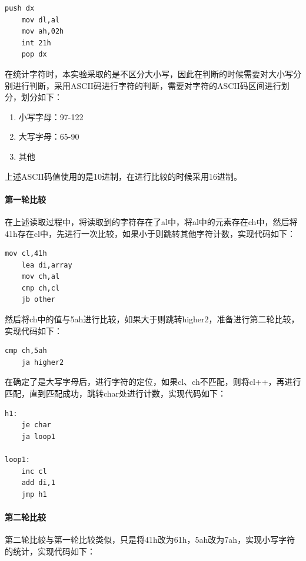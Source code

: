 \documentclass[UTF8,12pt]{article}
\begin{document}
\begin{lstlisting}[title=打印字符,frame=shadowbox]
    push dx
    mov dl,al
    mov ah,02h
    int 21h
    pop dx
\end{lstlisting}

在统计字符时，本实验采取的是不区分大小写，因此在判断的时候需要对大小写分别进行判断，采用ASCII码进行字符的判断，需要对字符的ASCII码区间进行划分，划分如下：

\begin{enumerate}
    \item 小写字母：97-122
    \item 大写字母：65-90
    \item 其他
\end{enumerate}

上述ASCII码值使用的是10进制，在进行比较的时候采用16进制。

\paragraph{第一轮比较}
在上述读取过程中，将读取到的字符存在了al中，将al中的元素存在ch中，然后将41h存在cl中，先进行一次比较，如果小于则跳转其他字符计数，实现代码如下：

\begin{lstlisting}[title=第一轮比较,frame=shadowbox]
    mov cl,41h
    lea di,array
    mov ch,al
    cmp ch,cl
    jb other
\end{lstlisting}

然后将ch中的值与5ah进行比较，如果大于则跳转higher2，准备进行第二轮比较，实现代码如下：

\begin{lstlisting}[title=第一轮比较,frame=shadowbox]
    cmp ch,5ah
    ja higher2
\end{lstlisting}

在确定了是大写字母后，进行字符的定位，如果cl、ch不匹配，则将cl++，再进行匹配，直到匹配成功，跳转char处进行计数，实现代码如下：

\begin{lstlisting}[title=第一轮比较,frame=shadowbox]
    h1:
    je char
    ja loop1

loop1:
    inc cl
    add di,1
    jmp h1
\end{lstlisting}

\paragraph{第二轮比较}
第二轮比较与第一轮比较类似，只是将41h改为61h，5ah改为7ah，实现小写字符的统计，实现代码如下：
\end{document}
